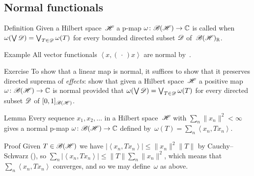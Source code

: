 \documentclass[a]{subfiles}
\begin{document}
\subsection{Normal functionals}
\begin{parsec}%
\begin{point}{Definition}%
Given a Hilbert space~$\mathscr{H}$
a p-map $\omega\colon \mathscr{B}(\mathscr{H})\to\mathbb{C}$
is called  when
$\omega(\bigvee \mathscr{D})=\bigvee_{T\in\mathscr{D}} \omega(T)$
for every bounded directed subset $\mathscr{D}$ of~$\mathscr{B}(\mathscr{H})_{\mathbb{R}}$.
\end{point}
\begin{point}{Example}%
All vector functionals
$\left<x,(\,\cdot\,)x\right>$ are normal by~.
\end{point}
\begin{point}{Exercise}%
To show that a linear map is normal, it suffices to show 
that it preserves directed suprema of \emph{effects}: 
show that given a Hilbert space~$\mathscr{H}$
a  positive map $\omega\colon \mathscr{B}(\mathscr{H})\to\mathbb{C}$
is normal 
provided that $\omega(\bigvee \mathscr{D}) = \bigvee_{T\in\mathscr{D}} \omega(T)$
for every directed subset $\mathscr{D}$ of $[0,1]_{\mathscr{B}(\mathscr{H})}$.
\end{point}
\begin{point}{Lemma}%
Every sequence $x_1,x_2,\dotsc $ in a Hilbert space~$\mathscr{H}$
with $\sum_n \|x_n\|^2 < \infty$
gives a normal p-map $\omega\colon\mathscr{B}(\mathscr{H})\to\mathbb{C}$
defined by~$\omega(T)=\sum_n \left<x_n,Tx_n\right>$.
\begin{point}{Proof}%
Given $T\in\mathscr{B}(\mathscr{H})$ 
we have $\left|\left<x_n,Tx_n\right>\right|\leq \|x_n\|^2\|T\|$ 
by Cauchy--Schwarz (),
so $\sum_n \left|\left<x_n,Tx_n\right>\right|
\leq \|T\| \sum_n \|x_n\|^2$,
which means that~$\sum_n \left<x_n,Tx_n\right>$
converges, 
and so we may define~$\omega$ as above.


\end{point}
\end{point}
\end{parsec}
\end{document}
